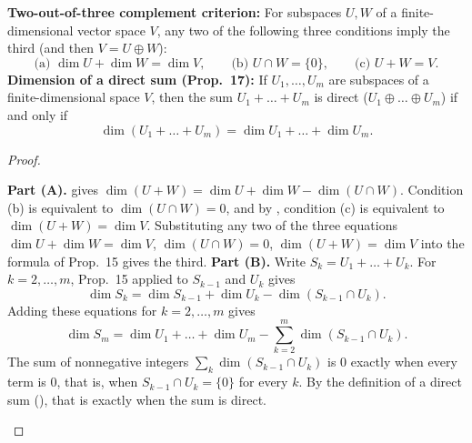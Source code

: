 \documentclass[10pt]{scrartcl}
\newcommand{\PacketInkPath}[2][]{\InkStroke[#1]{#2}}
\begin{document}
\begin{fig}
\end{fig}

\begin{proposition*}
  \begin{enumerate}[(A)]
    \ii \textbf{Two-out-of-three complement criterion:} For subspaces $U,W$ of a finite-dimensional vector space $V$, any two of the following three conditions imply the third (and then $V=U\oplus W$):
    \[
      \text{(a) }\dim U+\dim W=\dim V, \qquad \text{(b) }U\cap W=\{0\}, \qquad \text{(c) }U+W=V.
    \]
    \ii \textbf{Dimension of a direct sum (Prop.~17):} If $U_1,\dots,U_m$ are subspaces of a finite-dimensional space $V$, then the sum $U_1+\dots+U_m$ is direct ($U_1\oplus\dots\oplus U_m$) if and only if
    \[
      \dim(U_1+\dots+U_m) = \dim U_1 + \dots + \dim U_m.
    \]
  \end{enumerate}
\end{proposition*}
\begin{proof}
  \begin{steps}
    \ii \textbf{Part (A).}  gives $\dim(U+W)=\dim U+\dim W-\dim(U\cap W)$. Condition (b) is equivalent to $\dim(U\cap W)=0$, and by , condition (c) is equivalent to $\dim(U+W)=\dim V$. Substituting any two of the three equations $\dim U+\dim W=\dim V$, $\dim(U\cap W)=0$, $\dim(U+W)=\dim V$ into the formula of Prop.~15 gives the third.
    \ii \textbf{Part (B).} Write $S_k=U_1+\dots+U_k$. For $k=2,\dots,m$, Prop.~15 applied to $S_{k-1}$ and $U_k$ gives
    \[
      \dim S_k=\dim S_{k-1}+\dim U_k-\dim(S_{k-1}\cap U_k).
    \]
    Adding these equations for $k=2,\dots,m$ gives
    \[
      \dim S_m=\dim U_1+\dots+\dim U_m-\sum_{k=2}^m\dim(S_{k-1}\cap U_k).
    \]
    \ii The sum of nonnegative integers $\sum_k\dim(S_{k-1}\cap U_k)$ is $0$ exactly when every term is $0$, that is, when $S_{k-1}\cap U_k=\{0\}$ for every $k$. By the definition of a direct sum (), that is exactly when the sum is direct.
  \end{steps}
\end{proof}
\end{document}
